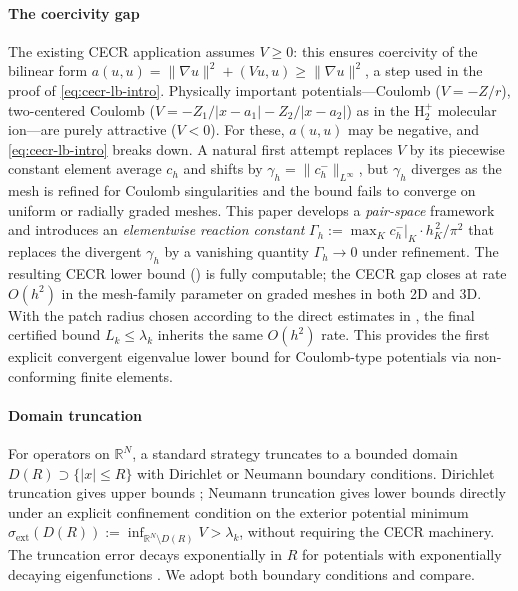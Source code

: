 \documentclass[11pt]{article}
\theoremstyle{plain}
\theoremstyle{definition}
\theoremstyle{remark}
\newcommand{\R}{\mathbb{R}}
\begin{document}
\paragraph{The coercivity gap}
The existing CECR application assumes $V \ge 0$:
this ensures coercivity of the bilinear form
$a(u,u) = \|\nabla u\|^2 + (Vu,u) \ge \|\nabla u\|^2$,
a step used in the proof of \eqref{eq:cecr-lb-intro}.
Physically important potentials—Coulomb ($V=-Z/r$),
two-centered Coulomb ($V=-Z_1/|x-a_1|-Z_2/|x-a_2|$)
as in the $\mathrm{H}_2^+$ molecular ion—are purely attractive ($V<0$).
For these, $a(u,u)$ may be negative, and \eqref{eq:cecr-lb-intro}
breaks down.  A natural first attempt replaces $V$ by its piecewise
constant element average $c_h$ and shifts by
$\gamma_h=\|c_h^-\|_{L^\infty}$, but $\gamma_h$ diverges as
the mesh is refined for Coulomb singularities and the bound fails to converge
on uniform or radially graded meshes.
This paper develops a \emph{pair-space} framework and introduces
an \emph{elementwise reaction constant}
$\Gamma_h:=\max_K c_h^-|_K\cdot h_K^{\,2}/\pi^2$
that replaces the divergent $\gamma_h$ by a vanishing quantity
$\Gamma_h\to 0$ under refinement. The resulting CECR lower bound
() is fully computable; the
CECR gap closes at rate $O(h^2)$ in the mesh-family parameter on
graded meshes in both 2D and 3D.
With the patch radius chosen according to the direct estimates in
, the final certified bound $L_k\le\lambda_k$
inherits the same $O(h^2)$ rate.
This provides the first explicit convergent eigenvalue lower bound
for Coulomb-type potentials via non-conforming finite elements.

\paragraph{Domain truncation}
For operators on $\R^N$, a standard strategy truncates to a bounded domain
$D(R)\supset\{|x|\le R\}$ with Dirichlet or Neumann boundary conditions.
Dirichlet truncation gives upper bounds \cite{Reed-Simon};
Neumann truncation gives lower bounds directly under an explicit
confinement condition on the exterior potential minimum
$\sigma_{\mathrm{ext}}(D(R)) := \inf_{\R^N\setminus D(R)} V > \lambda_k$,
without requiring the CECR machinery.
The truncation error decays exponentially in $R$ for potentials
with exponentially decaying eigenfunctions \cite{Agmon1982}.
We adopt both boundary conditions and compare.
\end{document}
